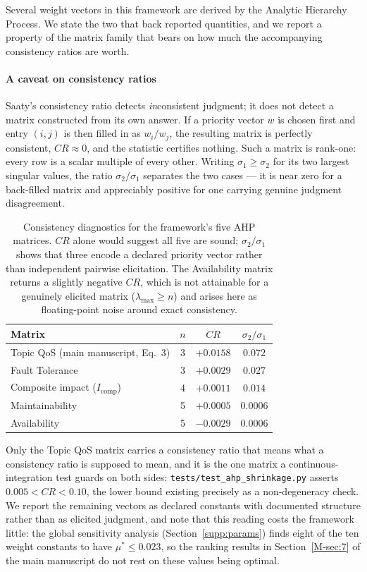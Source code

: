 \documentclass[preprint,3p]{elsarticle}
\begin{document}
Several weight vectors in this framework are derived by the Analytic Hierarchy Process. We state the two that back reported quantities, and we report a property of the matrix family that bears on how much the accompanying consistency ratios are worth.

\paragraph{A caveat on consistency ratios} Saaty's consistency ratio detects \emph{in}consistent judgment; it does not detect a matrix constructed from its own answer. If a priority vector $w$ is chosen first and entry $(i,j)$ is then filled in as $w_i / w_j$, the resulting matrix is perfectly consistent, $CR \approx 0$, and the statistic certifies nothing. Such a matrix is rank-one: every row is a scalar multiple of every other. Writing $\sigma_1 \ge \sigma_2$ for its two largest singular values, the ratio $\sigma_2 / \sigma_1$ separates the two cases --- it is near zero for a back-filled matrix and appreciably positive for one carrying genuine judgment disagreement.

\begin{table}[htbp]
\centering
\small
\caption{Consistency diagnostics for the framework's five AHP matrices. $CR$ alone would suggest all five are sound; $\sigma_2/\sigma_1$ shows that three encode a declared priority vector rather than independent pairwise elicitation. The Availability matrix returns a slightly negative $CR$, which is not attainable for a genuinely elicited matrix ($\lambda_{\max} \ge n$) and arises here as floating-point noise around exact consistency.}
\label{tab:ahp-diag}
\begin{tabular}{lccc}
\toprule
\textbf{Matrix} & \textbf{$n$} & \textbf{$CR$} & \textbf{$\sigma_2/\sigma_1$} \\
\midrule
Topic QoS (main manuscript, Eq.~3) & 3 & $+0.0158$ & $0.072$ \\
Fault Tolerance & 3 & $+0.0029$ & $0.027$ \\
\midrule
Composite impact ($I_{\text{comp}}$) & 4 & $+0.0011$ & $0.014$ \\
Maintainability & 5 & $+0.0005$ & $0.0006$ \\
Availability & 5 & $-0.0029$ & $0.0006$ \\
\bottomrule
\end{tabular}
\end{table}

\noindent Only the Topic QoS matrix carries a consistency ratio that means what a consistency ratio is supposed to mean, and it is the one matrix a continuous-integration test guards on both sides: \texttt{tests/test\_ahp\_shrinkage.py} asserts $0.005 < CR < 0.10$, the lower bound existing precisely as a non-degeneracy check. We report the remaining vectors as declared constants with documented structure rather than as elicited judgment, and note that this reading costs the framework little: the global sensitivity analysis (Section~\ref{supp:params}) finds eight of the ten weight constants to have $\mu^* \le 0.023$, so the ranking results in Section~\ref{M-sec:7} of the main manuscript do not rest on these values being optimal.
\end{document}
